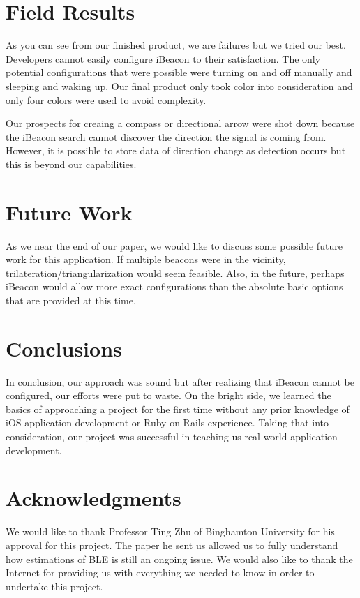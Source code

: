 \documentclass[10pt]{sensys-proc}
\begin{document}
\section{Field Results}
As you can see from our finished product, we are failures but we tried our best. Developers cannot easily configure iBeacon to their satisfaction. The only potential configurations that were possible were turning on and off manually and sleeping and waking up. Our final product only took color into consideration and only four colors were used to avoid complexity.

Our prospects for creaing a compass or directional arrow were shot down because the iBeacon search cannot discover the direction the signal is coming from. However, it is possible to store data of direction change as detection occurs but this is beyond our capabilities. 

\section{Future Work}
As we near the end of our paper, we would like to discuss some possible future work for this application. If multiple beacons were in the vicinity, trilateration/triangularization would seem feasible. Also, in the future, perhaps iBeacon would allow more exact configurations than the absolute basic options that are provided at this time.

\section{Conclusions}
In conclusion, our approach was sound but after realizing that iBeacon cannot be configured, our efforts were put to waste. On the bright side, we learned the basics of approaching a project for the first time without any prior knowledge of iOS application development or Ruby on Rails experience. Taking that into consideration, our project was successful in teaching us real-world application development.

\section{Acknowledgments}
We would like to thank Professor Ting Zhu of Binghamton University for his approval for this project. The paper he sent us allowed us to fully understand how estimations of BLE is still an ongoing issue. We would also like to thank the Internet for providing us with everything we needed to know in order to undertake this project.
\end{document}
